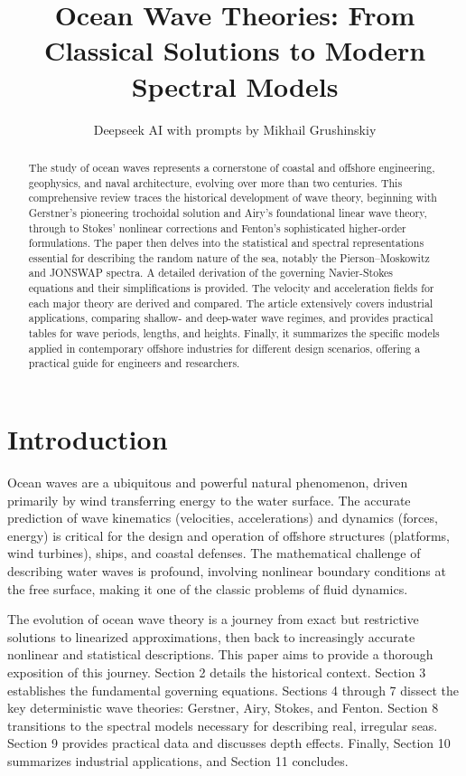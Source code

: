 \documentclass[11pt,letterpaper]{article}
\title{Ocean Wave Theories: From Classical Solutions to Modern Spectral Models}
\author{Deepseek AI with prompts by Mikhail Grushinskiy}
\date{}
\begin{document}
\maketitle

\begin{abstract}
\noindent The study of ocean waves represents a cornerstone of coastal and offshore engineering, geophysics, and naval architecture, evolving over more than two centuries. This comprehensive review traces the historical development of wave theory, beginning with Gerstner's pioneering trochoidal solution and Airy's foundational linear wave theory, through to Stokes' nonlinear corrections and Fenton’s sophisticated higher-order formulations. The paper then delves into the statistical and spectral representations essential for describing the random nature of the sea, notably the Pierson–Moskowitz and JONSWAP spectra. A detailed derivation of the governing Navier-Stokes equations and their simplifications is provided. The velocity and acceleration fields for each major theory are derived and compared. The article extensively covers industrial applications, comparing shallow- and deep-water wave regimes, and provides practical tables for wave periods, lengths, and heights. Finally, it summarizes the specific models applied in contemporary offshore industries for different design scenarios, offering a practical guide for engineers and researchers.
\end{abstract}

\newpage
\tableofcontents
\newpage

\section{Introduction}
Ocean waves are a ubiquitous and powerful natural phenomenon, driven primarily by wind transferring energy to the water surface. The accurate prediction of wave kinematics (velocities, accelerations) and dynamics (forces, energy) is critical for the design and operation of offshore structures (platforms, wind turbines), ships, and coastal defenses. The mathematical challenge of describing water waves is profound, involving nonlinear boundary conditions at the free surface, making it one of the classic problems of fluid dynamics.

The evolution of ocean wave theory is a journey from exact but restrictive solutions to linearized approximations, then back to increasingly accurate nonlinear and statistical descriptions. This paper aims to provide a thorough exposition of this journey. Section 2 details the historical context. Section 3 establishes the fundamental governing equations. Sections 4 through 7 dissect the key deterministic wave theories: Gerstner, Airy, Stokes, and Fenton. Section 8 transitions to the spectral models necessary for describing real, irregular seas. Section 9 provides practical data and discusses depth effects. Finally, Section 10 summarizes industrial applications, and Section 11 concludes.
\end{document}
